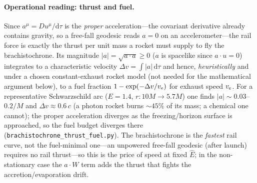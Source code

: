 \documentclass[12pt]{iopart}
\newcommand{\Ehat}{\hat E}
\newcommand{\dd}{\mathrm{d}}
\begin{document}
\paragraph{Operational reading: thrust and fuel.} Since $a^\mu=Du^\mu/\dd\tau$ is the
\emph{proper} acceleration---the covariant derivative already contains gravity, so a
free-fall geodesic reads $a=0$ on an accelerometer---the rail force is exactly the
thrust per unit mass a rocket must supply to fly the brachistochrone. Its magnitude
$|a|=\sqrt{a\cdot a}\ge0$ ($a$ is spacelike since $a\cdot u=0$) integrates to a
characteristic velocity $\Delta v=\int|a|\,\dd\tau$ and hence, \emph{heuristically}
and under a chosen constant-exhaust rocket model (not needed for the mathematical
argument below), to a fuel fraction $1-\exp(-\Delta v/v_{\rm e})$ for exhaust
speed $v_{\rm e}$. For a representative Schwarzschild arc ($E=1.4$, $r:10M\!\to\!5.7M$)
one finds $|a|\sim0.03$--$0.2/M$ and $\Delta v\approx0.6\,c$ (a photon rocket burns
$\sim\!45\%$ of its mass; a chemical one cannot); the proper acceleration diverges as
the freezing/horizon surface is approached, so the fuel budget diverges there
(\texttt{brachistochrone\_thrust\_fuel.py}). The brachistochrone is the
\emph{fastest} rail curve, not the fuel-minimal one---an unpowered free-fall geodesic
(after launch) requires no rail thrust---so this is the price of speed at fixed $\Ehat$; in the non-stationary case the
$a\cdot W$ term adds the thrust that fights the accretion/evaporation drift.
\end{document}
